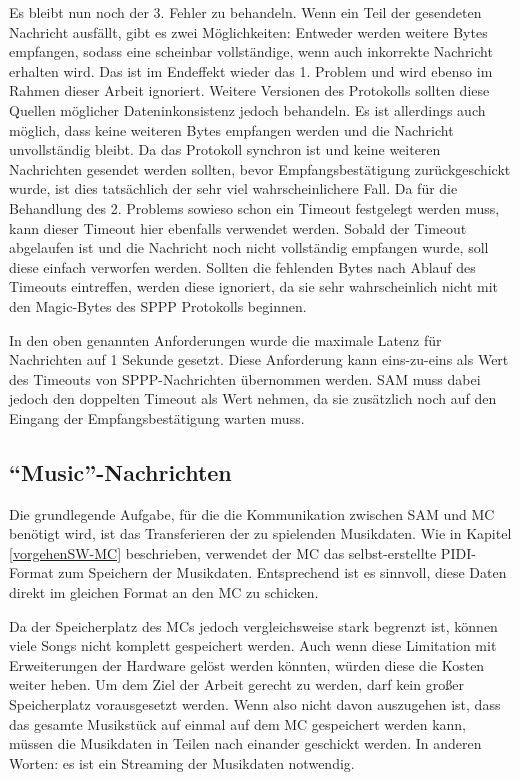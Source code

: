 Es bleibt nun noch der 3. Fehler zu behandeln.
Wenn ein Teil der gesendeten Nachricht ausfällt, gibt es zwei Möglichkeiten:
Entweder werden weitere Bytes empfangen, sodass eine scheinbar vollständige, wenn auch inkorrekte Nachricht erhalten wird.
Das ist im Endeffekt wieder das 1. Problem und wird ebenso im Rahmen dieser Arbeit ignoriert.
Weitere Versionen des Protokolls sollten diese Quellen möglicher Dateninkonsistenz jedoch behandeln.
Es ist allerdings auch möglich, dass keine weiteren Bytes empfangen werden und die Nachricht unvollständig bleibt.
Da das Protokoll synchron ist und keine weiteren Nachrichten gesendet werden sollten, bevor Empfangsbestätigung zurückgeschickt wurde, ist dies tatsächlich der sehr viel wahrscheinlichere Fall.
Da für die Behandlung des 2. Problems sowieso schon ein Timeout festgelegt werden muss, kann dieser Timeout hier ebenfalls verwendet werden.
Sobald der Timeout abgelaufen ist und die Nachricht noch nicht vollständig empfangen wurde, soll diese einfach verworfen werden.
Sollten die fehlenden Bytes nach Ablauf des Timeouts eintreffen, werden diese ignoriert, da sie sehr wahrscheinlich nicht mit den Magic-Bytes des \ac{SPPP} Protokolls beginnen.

In den oben genannten Anforderungen wurde die maximale Latenz für Nachrichten auf 1 Sekunde gesetzt.
Diese Anforderung kann eins-zu-eins als Wert des Timeouts von \ac{SPPP}-Nachrichten übernommen werden.
\ac{SAM} muss dabei jedoch den doppelten \ac{Timeout} als Wert nehmen, da sie zusätzlich noch auf den Eingang der Empfangsbestätigung warten muss.

\subsection{\enquote{Music}-Nachrichten} \label{SPPP-Pidi-Messages}

Die grundlegende Aufgabe, für die die Kommunikation zwischen \ac{SAM} und \ac{MC} benötigt wird, ist das Transferieren der zu spielenden Musikdaten.
Wie in Kapitel \ref{vorgehenSW-MC} beschrieben, verwendet der \ac{MC} das selbst-erstellte \ac{PIDI}-Format zum Speichern der Musikdaten.
Entsprechend ist es sinnvoll, diese Daten direkt im gleichen Format an den \ac{MC} zu schicken.

Da der Speicherplatz des \ac{MC}s jedoch vergleichsweise stark begrenzt ist, können viele Songs nicht komplett gespeichert werden.
Auch wenn diese Limitation mit Erweiterungen der Hardware gelöst werden könnten, würden diese die Kosten weiter heben.
Um dem Ziel der Arbeit gerecht zu werden, darf kein großer Speicherplatz vorausgesetzt werden.
Wenn also nicht davon auszugehen ist, dass das gesamte Musikstück auf einmal auf dem \ac{MC} gespeichert werden kann, müssen die Musikdaten in Teilen nach einander geschickt werden.
In anderen Worten: es ist ein Streaming der Musikdaten notwendig.


